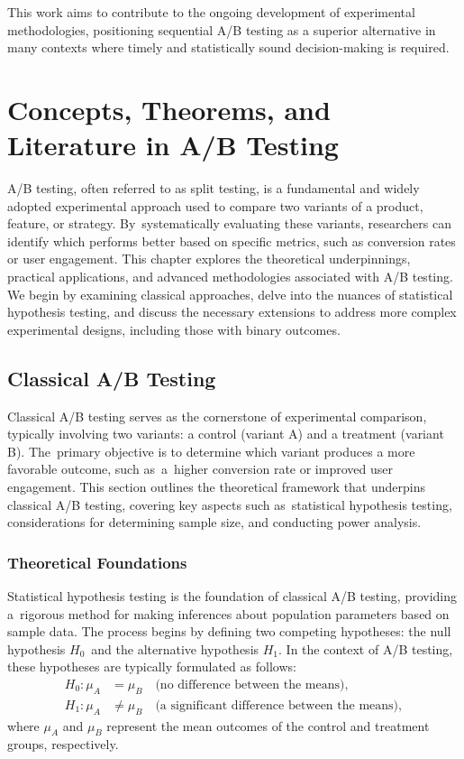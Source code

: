 \documentclass[magisterska, english]{pwr_wmat_praca_dyplomowa}
\theoremstyle{plain}
\numberwithin{theorem}{chapter}
\theoremstyle{definition}
\numberwithin{theorem}{chapter}
\begin{document}
This work aims to contribute to the ongoing development of experimental methodologies, positioning sequential A/B testing as a superior alternative in many contexts where timely and statistically sound decision-making is required.



\chapter{Concepts, Theorems, and Literature in A/B Testing}\label{ch:Testing}

A/B testing, often referred to as split testing, is a fundamental and widely adopted experimental approach used to compare two variants of a product, feature, or strategy. By~systematically evaluating these variants, researchers can identify which performs better based on specific metrics, such as conversion rates or user engagement. This chapter explores the theoretical underpinnings, practical applications, and advanced methodologies associated with A/B testing. We begin by examining classical approaches, delve into the nuances of statistical hypothesis testing, and discuss the necessary extensions to address more complex experimental designs, including those with binary outcomes.

\section{Classical A/B Testing}

Classical A/B testing serves as the cornerstone of experimental comparison, typically involving two variants: a control (variant A) and a treatment (variant B). The~primary objective is to determine which variant produces a more favorable outcome, such as~a~higher conversion rate or improved user engagement. This section outlines the theoretical framework that underpins classical A/B testing, covering key aspects such as~statistical hypothesis testing, considerations for determining sample size, and conducting power analysis.

\subsection{Theoretical Foundations}
Statistical hypothesis testing is the foundation of classical A/B testing, providing a~rigorous method for making inferences about population parameters based on sample data. The process begins by defining two competing hypotheses: the null hypothesis \( H_0 \)~and the alternative hypothesis \( H_1 \). In the context of A/B testing, these hypotheses are typically formulated as follows:
\begin{align*}
	H_0: \mu_A &= \mu_B \quad \text{(no difference between the means)},\\
	H_1: \mu_A &\neq \mu_B \quad \text{(a significant difference between the means)},
\end{align*}
where \( \mu_A \) and \( \mu_B \) represent the mean outcomes of the control and treatment groups, respectively.
\end{document}
